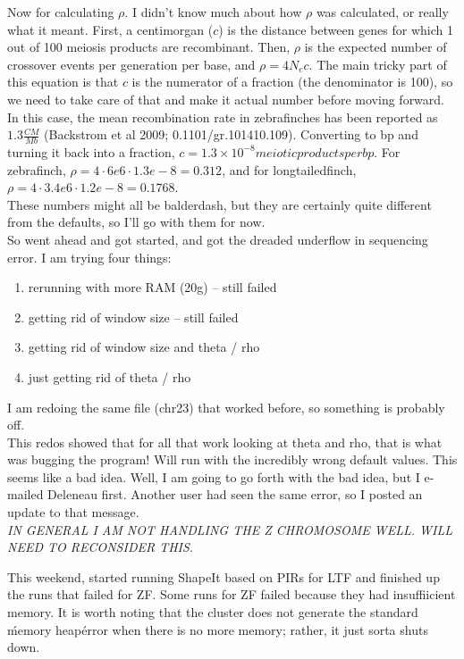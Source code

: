 \documentclass[idxtotoc,hyperref,openany,oneside]{labbook} %
\begin{document}
Now for calculating $\rho$. I didn't know much about how $\rho$ was calculated, or really what it meant. First, a centimorgan ($c$) is the distance between genes for which 1 out of 100 meiosis products are recombinant. Then, $\rho$ is the expected number of crossover events per generation per base, and $\rho = 4N_ec$. The main tricky part of this equation is that $c$ is the numerator of a fraction (the denominator is 100), so we need to take care of that and make it actual number before moving forward. In this case, the mean recombination rate in zebrafinches has been reported as $1.3 \frac{CM}{Mb}$ (Backstrom et al 2009; 0.1101/gr.101410.109). Converting to bp and turning it back into a fraction, $c = 1.3 \times 10^{-8} meiotic products per bp$. For zebrafinch, $\rho = 4 \cdot 6e6 \cdot 1.3e-8 = 0.312$, and for longtailedfinch, $\rho = 4 \cdot 3.4e6 \cdot 1.2e-8 = 0.1768$. \\

These numbers might all be balderdash, but they are certainly quite different from the defaults, so I'll go with them for now. \\

So went ahead and got started, and got the dreaded underflow in sequencing error. I am trying four things:
\begin{enumerate}
\item rerunning with more RAM (20g) -- still failed
\item getting rid of window size -- still failed
\item getting rid of window size and theta / rho
\item just getting rid of theta / rho
\end{enumerate}
I am redoing the same file (chr23) that worked before, so something is probably off. \\

This redos showed that for all that work looking at theta and rho, that is what was bugging the program! Will run with the incredibly wrong default values. This seems like a bad idea. Well, I am going to go forth with the bad idea, but I e-mailed Deleneau first. Another user had seen the same error, so I posted an update to that message. \\

\emph{IN GENERAL I AM NOT HANDLING THE Z CHROMOSOME WELL. WILL NEED TO RECONSIDER THIS.}


This weekend, started running ShapeIt based on PIRs for LTF and finished up the runs that failed for ZF. Some runs for ZF failed because they had insuffiicient memory. It is worth noting that the cluster does not generate the standard \'memory heap\' error when there is no more memory; rather, it just sorta shuts down. \\
\end{document}
